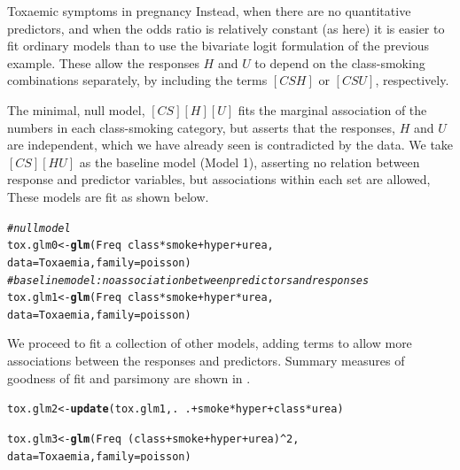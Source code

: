 \documentclass[11pt]{book}\usepackage[]{graphicx}\usepackage[]{color}
\makeatletter
\newcommand{\hlnum}[1]{\textcolor[rgb]{0.686,0.059,0.569}{#1}}%
\newcommand{\hlcom}[1]{\textcolor[rgb]{0.678,0.584,0.686}{\textit{#1}}}%
\newcommand{\hlopt}[1]{\textcolor[rgb]{0,0,0}{#1}}%
\newcommand{\hlstd}[1]{\textcolor[rgb]{0.345,0.345,0.345}{#1}}%
\newcommand{\hlkwb}[1]{\textcolor[rgb]{0.69,0.353,0.396}{#1}}%
\newcommand{\hlkwc}[1]{\textcolor[rgb]{0.333,0.667,0.333}{#1}}%
\newcommand{\hlkwd}[1]{\textcolor[rgb]{0.737,0.353,0.396}{\textbf{#1}}}%
\newenvironment{kframe}{%
 \def\at@end@of@kframe{}%
 \ifinner\ifhmode%
  \def\at@end@of@kframe{\end{minipage}}%
  \begin{minipage}{\columnwidth}%
 \fi\fi%
 \def\FrameCommand##1{\hskip\@totalleftmargin \hskip-\fboxsep
 \colorbox{shadecolor}{##1}\hskip-\fboxsep
     \hskip-\linewidth \hskip-\@totalleftmargin \hskip\columnwidth}%
 \MakeFramed {\advance\hsize-\width
   \@totalleftmargin\z@ \linewidth\hsize
   \@setminipage}}%
 {\par\unskip\endMakeFramed%
 \at@end@of@kframe}
\newenvironment{knitrout}{}{} %
\renewenvironment{knitrout}{\small\renewcommand{\baselinestretch}{.85}}{} %
\makeatother
\begin{document}
\begin{Example}[toxaemia]{Toxaemic symptoms in pregnancy}
Instead, when there are no quantitative predictors, and when the odds ratio is
relatively constant (as here)
it is easier to fit ordinary \loglin models
than to use the bivariate logit formulation of the previous example.
These allow the responses $H$ and $U$ to depend on the class-smoking
combinations separately, by including the terms $[CSH]$ or $[CSU]$,
respectively.

The minimal, null model, $[CS] [H] [U]$ fits the marginal association of the
numbers in each class-smoking category, but asserts that the responses,
$H$ and $U$ are independent, which we have already seen is contradicted
by the data.  We take $[CS] [HU]$ as the baseline model (Model 1), asserting no relation
between response and predictor variables, but associations within each set are allowed,
These models are fit as shown below.
\begin{knitrout}
\color{fgcolor}\begin{kframe}
\begin{alltt}
\hlcom{# null model}
\hlstd{tox.glm0} \hlkwb{<-} \hlkwd{glm}\hlstd{(Freq} \hlopt{~} \hlstd{class}\hlopt{*}\hlstd{smoke} \hlopt{+} \hlstd{hyper} \hlopt{+} \hlstd{urea,}
                \hlkwc{data}\hlstd{=Toxaemia,} \hlkwc{family}\hlstd{=poisson)}
\hlcom{# baseline model: no association between predictors and responses}
\hlstd{tox.glm1} \hlkwb{<-} \hlkwd{glm}\hlstd{(Freq} \hlopt{~} \hlstd{class}\hlopt{*}\hlstd{smoke} \hlopt{+} \hlstd{hyper}\hlopt{*}\hlstd{urea,}
                \hlkwc{data}\hlstd{=Toxaemia,} \hlkwc{family}\hlstd{=poisson)}
\end{alltt}
\end{kframe}
\end{knitrout}

We proceed to fit a collection of other models, adding terms to allow more associations
between the responses and predictors. Summary measures of goodness of fit
and parsimony are shown in .



\begin{knitrout}\footnotesize
{}\color{fgcolor}\begin{kframe}
\begin{alltt}
\hlstd{tox.glm2} \hlkwb{<-} \hlkwd{update}\hlstd{(tox.glm1, .} \hlopt{~} \hlstd{.} \hlopt{+} \hlstd{smoke}\hlopt{*}\hlstd{hyper} \hlopt{+} \hlstd{class}\hlopt{*}\hlstd{urea)}

\hlstd{tox.glm3} \hlkwb{<-} \hlkwd{glm}\hlstd{(Freq} \hlopt{~} \hlstd{(class} \hlopt{+} \hlstd{smoke} \hlopt{+} \hlstd{hyper} \hlopt{+} \hlstd{urea)}\hlopt{^}\hlnum{2}\hlstd{,}
                \hlkwc{data}\hlstd{=Toxaemia,} \hlkwc{family}\hlstd{=poisson)}


\end{alltt}
\end{kframe}
\end{knitrout}
\end{Example}
\end{document}
